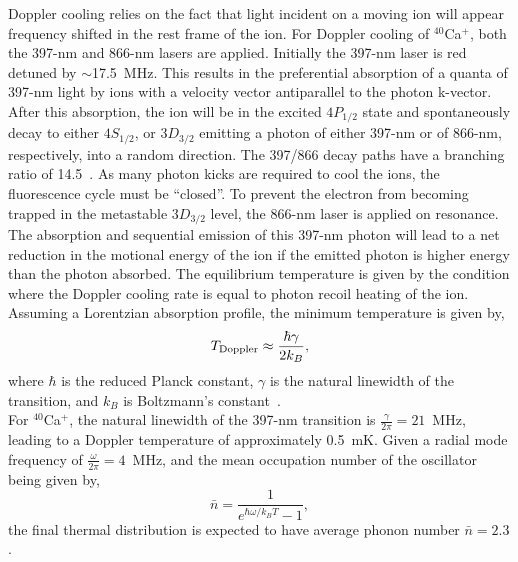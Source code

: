     Doppler cooling relies on the fact that light incident on a moving ion will
    appear frequency shifted in the rest frame of the ion. For Doppler cooling
    of $^{40}$Ca$^+$, both the 397-nm and 866-nm lasers are applied. Initially the 397-nm laser is red
    detuned by $\sim$17.5~MHz. This results in the preferential
    absorption of a quanta of 397-nm light by ions with a velocity vector
    antiparallel to the photon k-vector. After this absorption, the ion will be in the
    excited $4P_{1/2}$ state and spontaneously decay to either $4S_{1/2}$,
    or $3D_{3/2}$ emitting a photon of either 397-nm or of 866-nm,
    respectively, into a random direction. The 397/866 decay paths have a branching
    ratio of 14.5~\cite{ramm_precision_2013}. As many photon kicks are required to cool the ions, the fluorescence cycle must be ``closed''. To prevent the electron from becoming trapped in the metastable $3D_{3/2}$ level, the 866-nm laser is applied on resonance.  The absorption and sequential emission of this 397-nm photon
    will lead to a net reduction in the motional energy of the ion if the emitted photon
    is higher energy than the photon absorbed. The equilibrium
    temperature is given by the condition where the Doppler cooling rate is
    equal to photon recoil heating of the ion. Assuming a Lorentzian absorption
    profile, the minimum temperature is given by,
    \begin{equation}
    T_{\rm Doppler} \approx \frac{\hbar\gamma}{2k_B},
    \end{equation}
    where $\hbar$ is the reduced Planck constant, $\gamma$ is the natural
    linewidth of the transition, and $k_B$ is Boltzmann's constant~\cite{}.\\ For
    $^{40}$Ca$^+$, the natural linewidth of the 397-nm transition is $\frac{\gamma}{2\pi} =
    21$~MHz, leading to a Doppler temperature of approximately 0.5~mK. Given a radial mode frequency of $\frac{\omega}{2\pi} = 4$~MHz, and the mean occupation number of the oscillator being given by,
    \begin{equation}
        \bar{n} = \frac{1}{e^{\hbar\omega/k_B T}-1},
    \end{equation}
    the final thermal distribution is expected to have average phonon number $\bar{n} = 2.3$.

